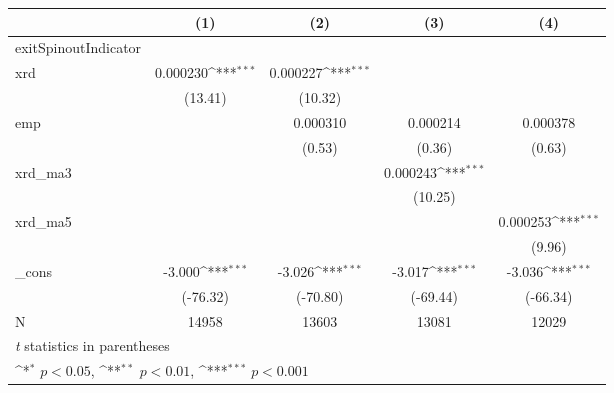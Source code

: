 {
\def\sym#1{\ifmmode^{#1}\else\(^{#1}\)\fi}
\begin{tabular}{l*{4}{c}}
\hline\hline
            &\multicolumn{1}{c}{(1)}         &\multicolumn{1}{c}{(2)}         &\multicolumn{1}{c}{(3)}         &\multicolumn{1}{c}{(4)}         \\
\hline
exitSpinoutIndicator&                     &                     &                     &                     \\
xrd         &    0.000230\sym{***}&    0.000227\sym{***}&                     &                     \\
            &     (13.41)         &     (10.32)         &                     &                     \\
[1em]
emp         &                     &    0.000310         &    0.000214         &    0.000378         \\
            &                     &      (0.53)         &      (0.36)         &      (0.63)         \\
[1em]
xrd\_ma3     &                     &                     &    0.000243\sym{***}&                     \\
            &                     &                     &     (10.25)         &                     \\
[1em]
xrd\_ma5     &                     &                     &                     &    0.000253\sym{***}\\
            &                     &                     &                     &      (9.96)         \\
[1em]
\_cons      &      -3.000\sym{***}&      -3.026\sym{***}&      -3.017\sym{***}&      -3.036\sym{***}\\
            &    (-76.32)         &    (-70.80)         &    (-69.44)         &    (-66.34)         \\
\hline
N           &       14958         &       13603         &       13081         &       12029         \\
\hline\hline
\multicolumn{5}{l}{\footnotesize \textit{t} statistics in parentheses}\\
\multicolumn{5}{l}{\footnotesize \sym{*} \(p<0.05\), \sym{**} \(p<0.01\), \sym{***} \(p<0.001\)}\\
\end{tabular}
}
